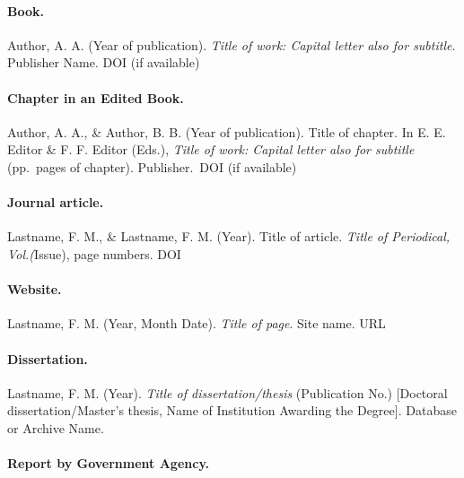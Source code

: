 \documentclass[
  b5paper]{book}
\begin{document}
\hypertarget{book.}{%
\paragraph*{Book.}\label{book.}}

Author, A. A. (Year of publication). \emph{Title of work: Capital letter also for subtitle}. Publisher Name. DOI (if available)

\hypertarget{chapter-in-an-edited-book.}{%
\paragraph*{Chapter in an Edited Book.}\label{chapter-in-an-edited-book.}}

Author, A. A., \& Author, B. B. (Year of publication). Title of chapter. In E. E. Editor \& F. F. Editor (Eds.), \emph{Title of work: Capital letter also for subtitle} (pp.~pages of chapter). Publisher.~DOI (if available)

\hypertarget{journal-article.}{%
\paragraph*{Journal article.}\label{journal-article.}}

Lastname, F. M., \& Lastname, F. M. (Year). Title of article. \emph{Title of Periodical, Vol.(}Issue), page numbers. DOI

\hypertarget{website.}{%
\paragraph*{Website.}\label{website.}}

Lastname, F. M. (Year, Month Date). \emph{Title of page}. Site name. URL

\hypertarget{dissertation.}{%
\paragraph*{Dissertation.}\label{dissertation.}}

Lastname, F. M. (Year). \emph{Title of dissertation/thesis} (Publication No.) {[}Doctoral dissertation/Master's thesis, Name of Institution Awarding the Degree{]}. Database or Archive Name.

\hypertarget{report-by-government-agency.}{%
\paragraph*{Report by Government Agency.}\label{report-by-government-agency.}}
\end{document}
